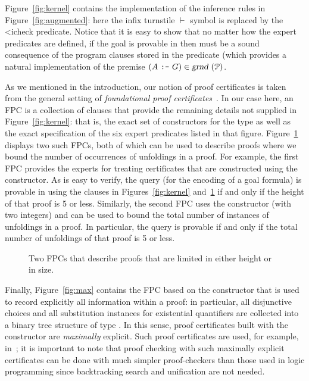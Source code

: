 \documentclass[a4paper,USenglish,cleveref, autoref, thm-restate]{lipics-v2019}
\begin{document}
Figure~\ref{fig:kernel} contains the \lP implementation of the
inference rules in Figure~\ref{fig:augmented}: here the infix
turnstile $\vdash$ symbol is replaced by the \lst<i{check} predicate.
%
Notice that it is easy to show that no matter how the expert predicates
are defined, if the goal  is provable in \lP then
 must be a sound consequence of the program clauses stored in
the  predicate (which provides a natural implementation of
the premise $(A~\hbox{\tt :-}~G)\in\hbox{\sl grnd}~({\mathcal P})$.

As we mentioned in the introduction, our notion of proof certificates
 is taken from the general setting of \emph{foundational
  proof certificates}~\cite{chihani17jar}.
%
In our case here, an FPC is a collection of \lP clauses that
provide the remaining details not supplied in Figure~\ref{fig:kernel}:
that is, the exact set of constructors for the  type as
well as the exact specification of the six expert predicates listed in
that figure.
%
Figure~\ref{fig:resources} displays two such FPCs,
both of which can be used to describe proofs where we bound
the number of occurrences of unfoldings in a proof.
%
For example, the first FPC
provides the experts for treating certificates that are constructed
using the  constructor.
%
As is easy to verify, the query \mbox{} (for the
encoding  of a goal formula) is provable in \lP using the
clauses in Figures~\ref{fig:kernel} and~\ref{fig:resources} if and
only if the height of that proof is 5 or less.
%
Similarly, the second FPC uses the constructor  (with two
integers) and can be used to bound the total number of instances of
unfoldings in a proof.
%
In particular, the query \mbox{}
is provable if and only if the total number of unfoldings of that
proof is 5 or less.


\begin{figure}


\caption{Two FPCs that describe proofs that are limited in either
  height or in size.}
\label{fig:resources}
\end{figure}

Finally, Figure~\ref{fig:max} contains the FPC based on the constructor
 that is used to record explicitly all information within a
proof: in particular, all disjunctive choices and all substitution
instances for existential quantifiers are collected into a binary tree
structure of type .
%
In this sense, proof certificates built with the 
constructor are \emph{maximally} explicit.
%
Such proof certificates are used, for example, in~\cite{Pair}; it is
important to note that proof checking with such maximally explicit
certificates can be done with much simpler proof-checkers than those
used in logic programming since backtracking search and unification
are not needed.
%
\end{document}
